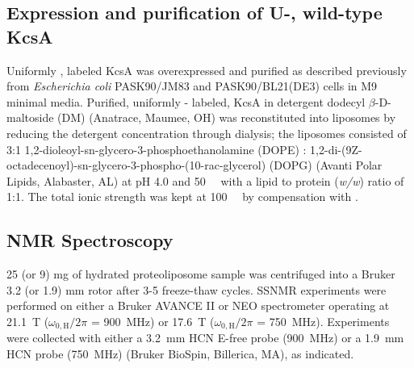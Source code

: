 \documentclass[%
 aip,
 amsmath,amssymb,
 preprint,%
]{revtex4-1}
\begin{document}
\subsection{Expression and purification of U-, wild-type KcsA}
Uniformly , labeled KcsA was overexpressed and purified as described previously from \textit{Escherichia coli} PASK90/JM83 and PASK90/BL21(DE3) cells in M9 minimal media.\cite{Bhate2013,Xu2017,Zhang2020a} Purified, uniformly - labeled, KcsA in detergent dodecyl $\beta$-D-maltoside (DM) (Anatrace, Maumee, OH) was reconstituted into liposomes by reducing the detergent concentration through dialysis; the liposomes consisted of 3:1 1,2-dioleoyl-sn-glycero-3-phosphoethanolamine (DOPE) : 1,2-di-(9Z-octadecenoyl)-sn-glycero-3-phospho-(10-rac-glycerol) (DOPG) (Avanti Polar Lipids, Alabaster, AL) at pH 4.0 and \SI{50}{\milli\molar}  with a lipid to protein (\textit{w/w}) ratio of 1:1. The total ionic strength was kept at \SI{100}{\milli\molar} by compensation with .

\subsection{NMR Spectroscopy}
25 (or 9) \si{\milli\gram} of hydrated proteoliposome sample was centrifuged into a Bruker 3.2 (or 1.9) \si{\milli\meter} rotor after 3-5 freeze-thaw cycles. SSNMR experiments were performed on either a Bruker AVANCE II or NEO spectrometer operating at \SI{21.1}{\tesla} ($\omega_{0,\text{H}}/2\pi$ = \SI{900}{\mega\hertz}) or \SI{17.6}{\tesla} ($\omega_{0,\text{H}}/2\pi$ = \SI{750}{\mega\hertz}). Experiments were collected with either a \SI{3.2}{\milli\meter} HCN E-free probe (\SI{900}{\mega\hertz}) or a \SI{1.9}{\milli\meter} HCN probe (\SI{750}{\mega\hertz}) (Bruker BioSpin, Billerica, MA), as indicated. 
\end{document}
